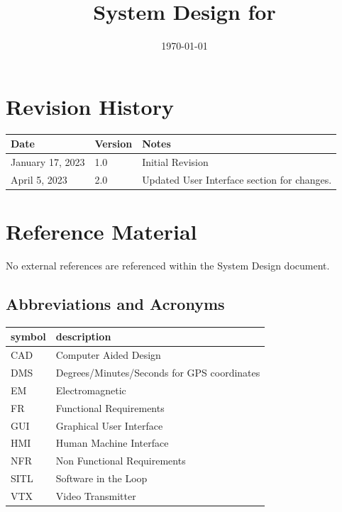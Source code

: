 \documentclass[12pt, titlepage]{article}
\begin{document}
\title{System Design for \progname{}} 
\author{\authname}
\date{\today}

\maketitle


\section{Revision History}

\begin{tabularx}{\textwidth}{p{3cm}p{2cm}X}
\toprule {\bf Date} & {\bf Version} & {\bf Notes}\\
\midrule
January 17, 2023 & 1.0 & Initial Revision\\
April 5, 2023 & 2.0 & Updated User Interface section for changes.\\
\bottomrule
\end{tabularx}

\newpage

\section{Reference Material}

No external references are referenced within the System Design document.

\subsection{Abbreviations and Acronyms}

\renewcommand{\arraystretch}{1.2}
\begin{tabular}{l l} 
  \toprule		
  \textbf{symbol} & \textbf{description}\\
  \midrule 
  CAD & Computer Aided Design \\
  DMS & Degrees/Minutes/Seconds for GPS coordinates \\
  EM & Electromagnetic \\
  FR & Functional Requirements \\
  GUI & Graphical User Interface \\
  HMI & Human Machine Interface \\
  NFR & Non Functional Requirements \\
  SITL & Software in the Loop \\
  VTX & Video Transmitter \\
  \bottomrule
\end{tabular}\\
\end{document}
